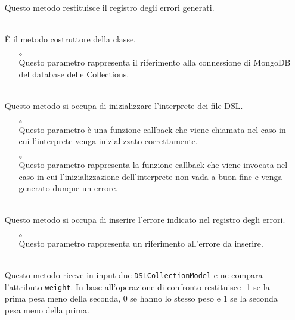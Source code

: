 \begin{itemize}
\begin{itemize}
\end{itemize}
\item[]  \\ Questo metodo restituisce il registro degli errori generati.
\item[]  \\ È il metodo costruttore della classe.
\begin{itemize}\addtolength{\itemsep}{-0.5\baselineskip}
\item[$\circ$]  \\ Questo parametro rappresenta il riferimento alla connessione di MongoDB del database delle Collections.
\end{itemize}
\item[]  \\ Questo metodo si occupa di inizializzare l'interprete dei file DSL.
\begin{itemize}\addtolength{\itemsep}{-0.5\baselineskip}
\item[$\circ$]  \\ Questo parametro è una funzione callback che viene chiamata nel caso in cui l'interprete venga inizializzato correttamente.
\item[$\circ$]  \\ Questo parametro rappresenta la funzione callback che viene invocata nel caso in cui l'inizializzazione dell'interprete non vada a buon fine e venga generato dunque un errore.
\end{itemize}
\item[]  \\ Questo metodo si occupa di inserire l'errore indicato nel registro degli errori.
\begin{itemize}\addtolength{\itemsep}{-0.5\baselineskip}
\item[$\circ$]  \\ Questo parametro rappresenta un riferimento all'errore da inserire.
\end{itemize}
\item[]  \\ Questo metodo riceve in input due \texttt{DSLCollectionModel} e ne compara l'attributo \texttt{weight}. In base all'operazione di confronto restituisce -1 se la prima pesa meno della seconda, 0 se hanno lo stesso peso e 1 se la seconda pesa meno della prima.

\end{itemize}

